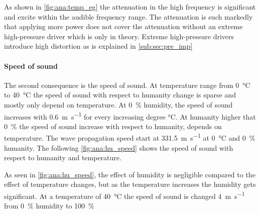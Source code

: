 

As shown in \autoref{fig:ana:temp_eg} the attenuation in the high frequency is significant and excite  within the audible frequency range. The attenuation is such markedly that applying more power does not cover the attenuation without an extreme high-pressure driver which is only in theory. Extreme high-pressure drivers introduce high distortion as is explained in \autoref{sub:sec:pre_imp}
\paragraph{Speed of sound} The second consequence is the speed of sound. At temperature range from \SI{0}{\celsius} to \SI{40}{\celsius} the speed of sound with respect to humanity change is sparse and mostly only depend on temperature. At \SI{0}{\percent} humidity, the speed of sound increases with \SI{0.6}{\meter\per\second} for every increasing degree \si{\celsius}. At humanity higher that \SI{0}{\percent} the speed of sound increase with respect to humanity, depends on temperature. The wave propagation speed start at \SI{331.5}{\meter\per\second} at \SI{0}{\celsius} and \SI{0}{\percent} humanity. The following \autoref{fig:ana:hu_speed} shows the speed of sound with respect to humanity and temperature. 


As seen in \autoref{fig:ana:hu_speed}, the effect of humidity is negligible compared to the effect of temperature changes, but as the temperature increases the humidity gets significant. At a temperature of \SI{40}{\celsius} the speed of sound is changed \SI{4}{\meter\per\second} from \SI{0}{\percent} humidity to \SI{100}{\percent}


